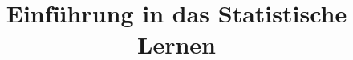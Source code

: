 






\newcommand{\titlefigure}{figure/illustration_title.png}
\newcommand{\learninggoals}{
  \item Understand impact of different loss functions and
  \item Understand impact of different base learners for regression
}

\title{Einführung in das Statistische Lernen}
\date{}





